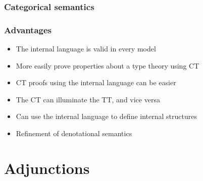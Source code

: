 \documentclass[
xcolor={usenames,dvipsnames,svgnames},
]{beamer}
\begin{document}
  \begin{frame}[fragile]
    \frametitle{Categorical semantics}

    \begin{center}


    \end{center}

  \end{frame}

  \begin{frame}
    \frametitle{Advantages}

    \begin{itemize}
      \item The internal language is valid in every model
      \item More easily prove properties about a type theory using CT
      \item CT proofs using the internal language can be easier
      \item The CT can illuminate the TT, and vice versa
      \item Can use the internal language to define internal structures
      \item Refinement of denotational semantics
    \end{itemize}
  \end{frame}

  \section{Adjunctions}
\end{document}

